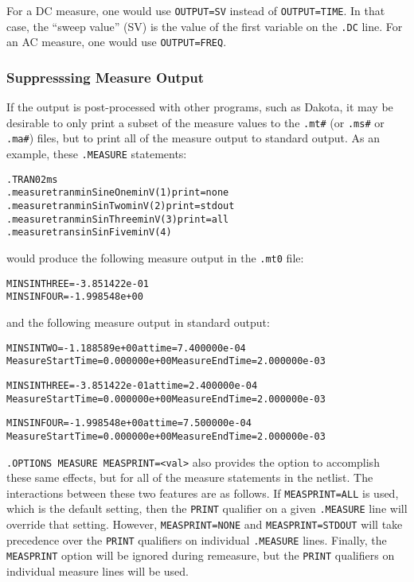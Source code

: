 For a DC measure, one would use \texttt{OUTPUT=SV} instead
of \texttt{OUTPUT=TIME}.  In that case, the ``sweep value'' (SV) is
the value of the first variable on the
\texttt{.DC} line. For an AC measure, one would use \texttt{OUTPUT=FREQ}.

\subsubsection{Suppresssing Measure Output}
\label{Measure_Suppressing_Measure_Output}
If the \Xyce{} output is post-processed with other programs, such as
Dakota, it may be desirable to only print a subset of the measure
values to the \texttt{.mt\#} (or \texttt{.ms\#} or \texttt{.ma\#})
files, but to print all of the measure output to standard output.  As
an example, these {\tt .MEASURE} statements:
\begin{alltt}
.TRAN 0  2ms
.measure tran minSineOne  min V(1) print=none
.measure tran minSinTwo   min V(2) print=stdout
.measure tran minSinThree min V(3) print=all
.measure tran sinSinFive  min V(4)
\end{alltt}
would produce the following measure output in the {\tt .mt0} file:
\begin{alltt}
MINSINTHREE = -3.851422e-01
MINSINFOUR = -1.998548e+00
\end{alltt}
and the following measure output in standard output:
\begin{alltt}
MINSINTWO = -1.188589e+00 at time = 7.400000e-04
Measure Start Time= 0.000000e+00	Measure End Time= 2.000000e-03

MINSINTHREE = -3.851422e-01 at time = 2.400000e-04
Measure Start Time= 0.000000e+00	Measure End Time= 2.000000e-03

MINSINFOUR = -1.998548e+00 at time = 7.500000e-04
Measure Start Time= 0.000000e+00	Measure End Time= 2.000000e-03
\end{alltt}

\texttt{.OPTIONS MEASURE MEASPRINT=<val>} also provides the option to accomplish
these same effects, but for all of the measure statements in the
netlist.  The interactions between these two features are as follows.
If \texttt{MEASPRINT=ALL} is used, which is the default setting, then
the \texttt{PRINT} qualifier on a given
\texttt{.MEASURE} line will override that setting.  However,
\texttt{MEASPRINT=NONE}
and \texttt{MEASPRINT=STDOUT} will take precedence over
the \texttt{PRINT} qualifiers on individual \texttt{.MEASURE} lines.
Finally, the \texttt{MEASPRINT} option will be ignored during
remeasure, but the \texttt{PRINT} qualifiers on individual measure
lines will be used.

